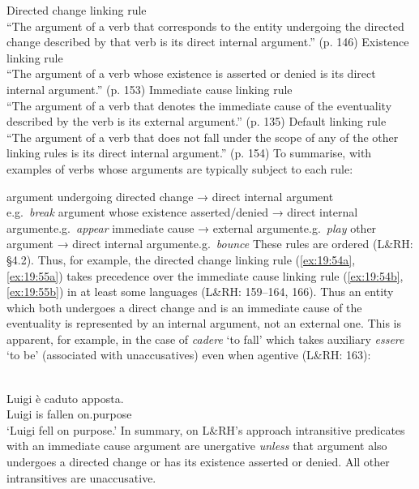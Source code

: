 \documentclass[output=paper]{langsci/langscibook}
\begin{document}
\ea\label{ex:19:54}
    \ea\label{ex:19:54a} Directed change linking rule\\ \enquote{The argument of a verb that corresponds to the entity undergoing the directed change described by that verb is its direct internal argument.} (p. 146)
    \ex\label{ex:19:54b} Existence linking rule\\ \enquote{The argument of a verb whose existence is asserted or denied is its direct internal argument.} (p. 153)
    \ex\label{ex:19:54c} Immediate cause linking rule\\ \enquote{The argument of a verb that denotes the immediate cause of the eventuality described by the verb is its external argument.} (p. 135)
    \ex\label{ex:19:54d} Default linking rule\\ \enquote{The argument of a verb that does not fall under the scope of any of the other linking rules is its direct internal argument.} (p. 154)
    \z
\z
To summarise, with examples of verbs whose arguments are typically subject to
each rule:

\ea\label{ex:19:55}
    \ea\label{ex:19:55a} argument undergoing directed change → direct internal argument\\\hfill e.g.\ \emph{break}
    \ex\label{ex:19:55b} argument whose existence asserted/denied → direct internal argument\hfill e.g.\ \emph{appear}
    \ex\label{ex:19:55c} immediate cause → external argument\hfill e.g.\ \emph{play}
    \ex\label{ex:19:55d} other argument → direct internal argument\hfill e.g.\ \emph{bounce}
    \z
\z
These rules are ordered (L\&RH: §4.2). Thus, for example, the directed change
linking rule (\ref{ex:19:54a}, \ref{ex:19:55a}) takes precedence over the immediate cause linking rule
(\ref{ex:19:54b}, \ref{ex:19:55b}) in at least some languages (L\&RH: 159–164, 166). Thus an entity
which both undergoes a direct change and is an immediate cause of the
eventuality is represented by an internal argument, not an external one. This
is apparent, for example, in the case of  \emph{cadere} \enquote*{to
fall} which takes auxiliary \emph{essere} \enquote*{to be} (associated with
unaccusatives) even when agentive (L\&RH: 163):

\ea {}\\
    \gll Luigi   è   caduto   apposta.\\
        Luigi   is   fallen   on.purpose\\
    \glt \enquote*{Luigi fell on purpose.}
\z
In summary, on L\&RH’s approach intransitive predicates with an immediate cause
argument are unergative \emph{unless} that argument also undergoes a directed
change or has its existence asserted or denied. All other intransitives are
unaccusative.
\end{document}
